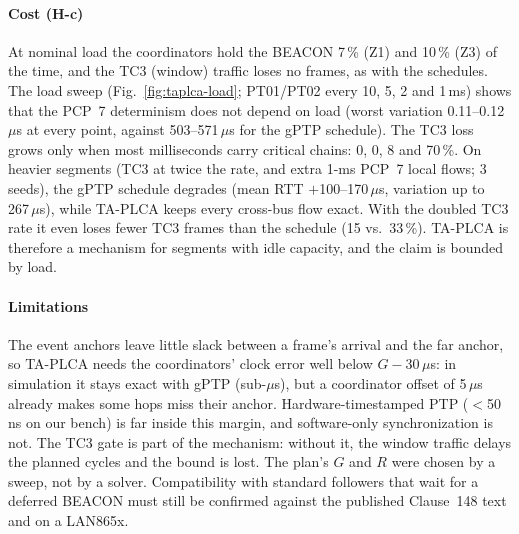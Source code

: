 \paragraph{Cost (H-c)}
At nominal load the coordinators hold the BEACON 7\,\% (Z1) and 10\,\% (Z3) of the time,
and the TC3 (window) traffic loses no frames, as with the schedules. The load sweep
(Fig.~\ref{fig:taplca-load}; PT01/PT02 every 10, 5, 2 and 1\,ms) shows that the PCP~7
determinism does not depend on load (worst variation 0.11--0.12\,$\mu$s at every point,
against 503--571\,$\mu$s for the gPTP schedule). The TC3 loss grows only when most
milliseconds carry critical chains: 0, 0, 8 and 70\,\%. On heavier segments (TC3 at twice
the rate, and extra 1-ms PCP~7 local flows; 3 seeds), the gPTP schedule degrades
(mean RTT $+$100--170\,$\mu$s, variation up to 267\,$\mu$s), while TA-PLCA keeps every
cross-bus flow exact. With the doubled TC3 rate it even loses fewer TC3 frames than the
schedule (15 vs.\ 33\,\%). TA-PLCA is therefore a mechanism for segments with idle
capacity, and the claim is bounded by load.

\paragraph{Limitations}
The event anchors leave little slack between a frame's arrival and the far anchor, so
TA-PLCA needs the coordinators' clock error well below $G - 30\,\mu$s: in simulation it
stays exact with gPTP (sub-$\mu$s), but a coordinator offset of 5\,$\mu$s already makes
some hops miss their anchor. Hardware-timestamped PTP ($<$50\,ns on our bench) is far
inside this margin, and software-only synchronization is not. The TC3 gate is part of
the mechanism: without it, the window traffic delays the planned cycles and the bound is
lost. The plan's $G$ and $R$ were chosen by a sweep, not by a solver. Compatibility with
standard followers that wait for a deferred BEACON must still be confirmed against the
published Clause~148 text and on a LAN865x.

